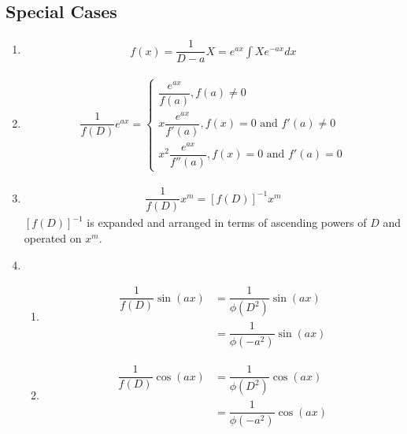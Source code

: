 \documentclass[../main.tex]{subfile}
\begin{document}
        \subsection{Special Cases}
        \begin{enumerate}
        \item \begin{align}
                    f(x) = \dfrac{1}{D-a} X = e^{ax}\int X e^{-ax} dx
                \end{align}

        \item \begin{align}
            \dfrac{1}{f(D)} e^{ax} = \begin{cases}
                                        \dfrac{e^{ax}}{f(a)}, f(a) \neq 0\\
                                        x\dfrac{e^{ax}}{f'(a)}, f(x) = 0 \text{ and } f'(a)\neq 0\\
                                        x^2\dfrac{e^{ax}}{f''(a)}, f(x) = 0 \text{ and } f'(a) = 0
                                    \end{cases}
        \end{align}

        \item \begin{align}
                \dfrac{1}{f(D)}x^m=[f(D)]^{-1} x^m
              \end{align}
        $[f(D)]^{-1}$ is expanded and arranged in terms of ascending powers of $D$ and operated on $x^m$.

        \item 
        \begin{enumerate}
            \item
                \begin{align}
                    \dfrac{1}{f(D)} \sin (ax) & = \dfrac{1}{\phi(D^2)} \sin (ax) \nonumber \\
                    & = \dfrac{1}{\phi(-a^2)} \sin (ax)
                \end{align}

            \item
                \begin{align}
                    \dfrac{1}{f(D)} \cos (ax) & = \dfrac{1}{\phi(D^2)} \cos (ax) \nonumber \\
                    & = \dfrac{1}{\phi(-a^2)} \cos (ax)
                \end{align}
        \end{enumerate}


\end{enumerate}
\end{document}
